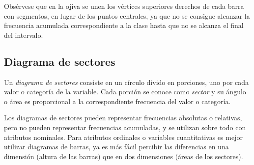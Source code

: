 \documentclass[
  a4paper,
]{scrreport}
\theoremstyle{plain}
\theoremstyle{definition}
\theoremstyle{definition}
\theoremstyle{remark}
\begin{document}
Obsérvese que en la ojiva se unen los vértices superiores derechos de
cada barra con segmentos, en lugar de los puntos centrales, ya que no se
consigue alcanzar la frecuencia acumulada correspondiente a la clase
hasta que no se alcanza el final del intervalo.

\subsection{Diagrama de sectores}\label{diagrama-de-sectores}

Un \emph{diagrama de sectores} consiste en un círculo divido en
porciones, uno por cada valor o categoría de la variable. Cada porción
se conoce como \emph{sector} y su ángulo o área es proporcional a la
correspondiente frecuencia del valor o categoría.

Los diagramas de sectores pueden representar frecuencias absolutas o
relativas, pero no pueden representar frecuencias acumuladas, y se
utilizan sobre todo con atributos nominales. Para atributos ordinales o
variables cuantitativas es mejor utilizar diagramas de barras, ya es más
fácil percibir las diferencias en una dimensión (altura de las barras)
que en dos dimensiones (áreas de los sectores).
\end{document}
